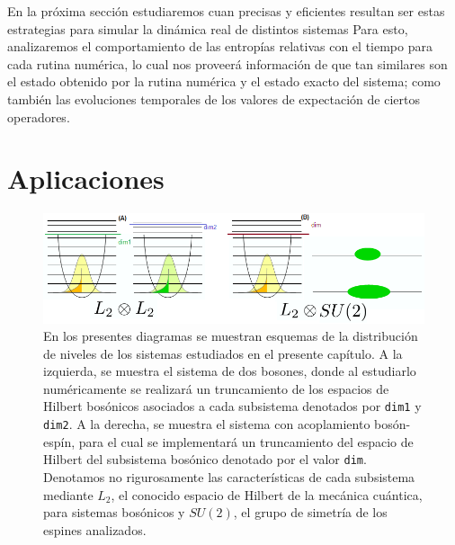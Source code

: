 \documentclass{report} %
\numberwithin{equation}{section}
\begin{document}
En la próxima sección estudiaremos cuan precisas y eficientes resultan ser estas estrategias para simular la dinámica real de distintos sistemas 
Para esto, analizaremos el comportamiento de las entropías relativas con el tiempo para cada rutina numérica, lo cual nos proveerá información de que tan similares son el estado obtenido por la rutina numérica y el estado exacto del sistema; como también las evoluciones temporales de los valores de expectación de ciertos operadores.


\chapter{Aplicaciones}
\label{chapter5}


\begin{figure}
    \centering
    \includegraphics[scale=0.50]{figs/fig_models-cap5.png}
    \caption{En los presentes diagramas se muestran esquemas de la distribución de niveles de los sistemas estudiados en el presente capítulo. A la izquierda, se muestra el sistema de dos bosones, donde al estudiarlo numéricamente se realizará un truncamiento de los espacios de Hilbert bosónicos asociados a cada subsistema denotados por \texttt{dim1} y \texttt{dim2}. A la derecha, se muestra el sistema con acoplamiento bosón-espín, para el cual se implementará un truncamiento del espacio de Hilbert del subsistema bosónico denotado por el valor \texttt{dim}. Denotamos no rigurosamente las características de cada subsistema mediante $L_2$, el conocido espacio de Hilbert de la mecánica cuántica, para sistemas bosónicos y $SU(2)$, el grupo de simetría de los espines analizados.}
    \label{fig_models-cap5}
\end{figure}
\end{document}
